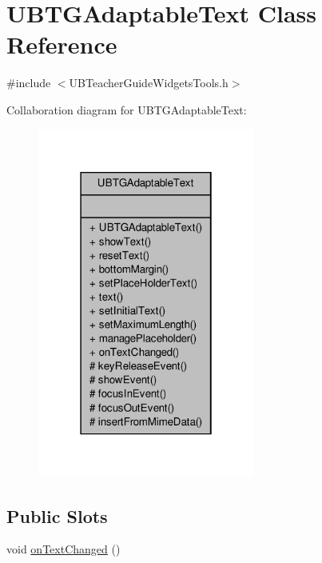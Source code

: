 \hypertarget{class_u_b_t_g_adaptable_text}{\section{U\-B\-T\-G\-Adaptable\-Text Class Reference}
\label{d9/d07/class_u_b_t_g_adaptable_text}
}


{\ttfamily \#include $<$U\-B\-Teacher\-Guide\-Widgets\-Tools.\-h$>$}



Collaboration diagram for U\-B\-T\-G\-Adaptable\-Text\-:
\nopagebreak
\begin{figure}[H]
\begin{center}
\leavevmode
\includegraphics[width=202pt]{d5/d8a/class_u_b_t_g_adaptable_text__coll__graph}
\end{center}
\end{figure}
\subsection*{Public Slots}
\begin{DoxyCompactItemize}
\item 
void \hyperlink{class_u_b_t_g_adaptable_text_ad1dc392b4eb83cd13e37b9f0e808a036}{on\-Text\-Changed} ()
\end{DoxyCompactItemize}
